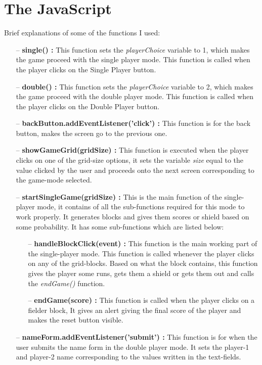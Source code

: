 \documentclass{article}
\begin{document}
\section{The JavaScript \autocite{ref5}}
Brief explanations of some of the functions I used:
\begin{itemize}
    \item[--] \textbf{single() : }This function sets the \emph{playerChoice} variable to 1, which makes the game proceed with the single player mode. This function is called when the player clicks on the Single Player button. 
    \item[--] \textbf{double() : }This function sets the \emph{playerChoice} variable to 2, which makes the game proceed with the double player mode. This function is called when the player clicks on the Double Player button. 
    \item[--] \textbf{backButton.addEventListener('click') : }This function is for the back button, makes the screen go to the previous one.\autocite{ref4}
    \item[--] \textbf{showGameGrid(gridSize) : }This function is executed when the player clicks on one of the grid-size options, it sets the variable \emph{size} equal to the value clicked by the user and proceeds onto the next screen corresponding to the game-mode selected.
    \item[--] \textbf{startSingleGame(gridSize) : }This is the main function of the single-player mode, it contains of all the sub-functions required for this mode to work properly. It generates blocks and gives them scores or shield based on some probability. It has some sub-functions which are listed below:
    \begin{itemize}
        \item[--] \textbf{handleBlockClick(event) : }This function is the main working part of the single-player mode. This function is called whenever the player clicks on any of the grid-blocks. Based on what the block contains, this function gives the player some runs, gets them a shield or gets them out and calls the \emph{endGame()} function.
        \item[--] \textbf{endGame(score) : }This function is called when the player clicks on a fielder block, It gives an alert giving the final score of the player and makes the reset button visible.
    \end{itemize}
    \item[--] \textbf{nameForm.addEventListener('submit') : }This function is for when the user submits the name form in the double player mode. It sets the player-1 and player-2 name corresponding to the values written in the text-fields. 

\end{itemize}
\end{document}
